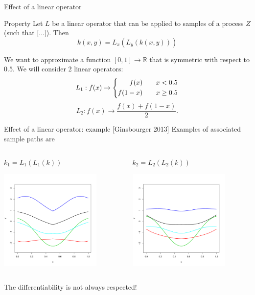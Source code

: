 \documentclass{beamer}
\begin{document}
\begin{frame}{Effect of a linear operator}
\begin{block}{Property}
Let $L$ be a linear operator that can be applied to samples of a process $Z$ {\tiny(such that [...])}. Then
    \begin{equation*}
        k(x,y) = L_x(L_y(k(x,y)))
    \end{equation*}
\end{block}
\begin{example}
  We want to approximate a function $[0,1] \rightarrow \mathds{R}$ that is symmetric with respect to $0.5$.
We will consider 2 linear operators:
\begin{equation*}
 L_1 : f(x) \rightarrow 
\left\{ 
\begin{aligned}
 f(x) \text{\qquad}  & x < 0.5 \\
 f(1-x) \text{\qquad}   & x \geq 0.5 
\end{aligned}
\right.
\end{equation*}
$$ L_2 : f(x) \rightarrow \frac{f(x) + f(1-x)}{2}.$$
\end{example}
\end{frame}

\begin{frame}{Effect of a linear operator: example [Ginsbourger 2013]}
Examples of associated sample paths are 

\begin{columns}[c]
\begin{column}{5cm}
\begin{center}
 $k_1 = L_1(L_1(k))$
\end{center}
 \includegraphics[height=5cm]{figures/p2-sym1}
\end{column}
\begin{column}{5cm}
\begin{center}
 $k_2= L_2(L_2(k))$
\end{center}
 \includegraphics[height=5cm]{figures/p2-sym2}
\end{column}
\end{columns}
The differentiability is not always respected!
\end{frame}
\end{document}
